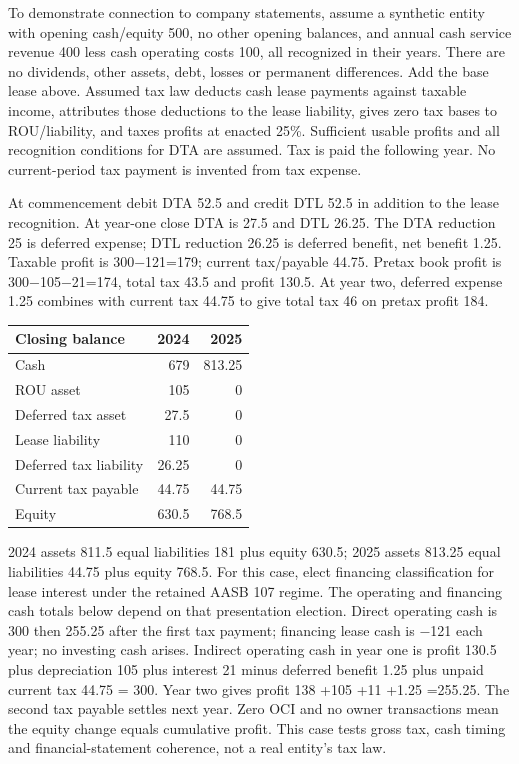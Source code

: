 To demonstrate connection to company statements, assume a synthetic entity with opening cash/equity 500, no other opening balances, and annual cash service revenue 400 less cash operating costs 100, all recognized in their years. There are no dividends, other assets, debt, losses or permanent differences. Add the base lease above. Assumed tax law deducts cash lease payments against taxable income, attributes those deductions to the lease liability, gives zero tax bases to ROU/liability, and taxes profits at enacted 25\%. Sufficient usable profits and all recognition conditions for DTA are assumed. Tax is paid the following year. No current-period tax payment is invented from tax expense.

At commencement debit DTA 52.5 and credit DTL 52.5 in addition to the lease recognition. At year-one close DTA is 27.5 and DTL 26.25. The DTA reduction 25 is deferred expense; DTL reduction 26.25 is deferred benefit, net benefit 1.25. Taxable profit is 300\ensuremath{-}121=179; current tax/payable 44.75. Pretax book profit is 300\ensuremath{-}105\ensuremath{-}21=174, total tax 43.5 and profit 130.5. At year two, deferred expense 1.25 combines with current tax 44.75 to give total tax 46 on pretax profit 184.

\begin{center}
\begin{tabular}{lrr}
\toprule Closing balance & 2024 & 2025\\\midrule
Cash & 679 & 813.25\\
ROU asset & 105 & 0\\
Deferred tax asset & 27.5 & 0\\
Lease liability & 110 & 0\\
Deferred tax liability & 26.25 & 0\\
Current tax payable & 44.75 & 44.75\\
Equity & 630.5 & 768.5\\\bottomrule
\end{tabular}
\end{center}


2024 assets 811.5 equal liabilities 181 plus equity 630.5; 2025 assets 813.25 equal liabilities 44.75 plus equity 768.5. For this case, elect financing classification for lease interest under the retained AASB 107 regime. The operating and financing cash totals below depend on that presentation election. Direct operating cash is 300 then 255.25 after the first tax payment; financing lease cash is \ensuremath{-}121 each year; no investing cash arises. Indirect operating cash in year one is profit 130.5 plus depreciation 105 plus interest 21 minus deferred benefit 1.25 plus unpaid current tax 44.75 = 300. Year two gives profit 138 +105 +11 +1.25 =255.25. The second tax payable settles next year. Zero OCI and no owner transactions mean the equity change equals cumulative profit. This case tests gross tax, cash timing and financial-statement coherence, not a real entity's tax law.

